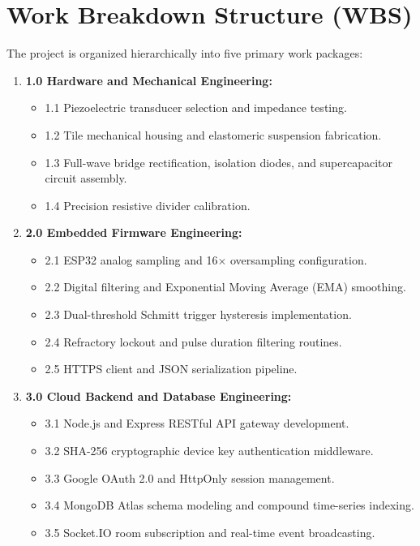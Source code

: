 \section{Work Breakdown Structure (WBS)}
The project is organized hierarchically into five primary work packages:
\begin{enumerate}
    \item \textbf{1.0 Hardware and Mechanical Engineering:}
    \begin{itemize}
        \item 1.1 Piezoelectric transducer selection and impedance testing.
        \item 1.2 Tile mechanical housing and elastomeric suspension fabrication.
        \item 1.3 Full-wave bridge rectification, isolation diodes, and supercapacitor circuit assembly.
        \item 1.4 Precision resistive divider calibration.
    \end{itemize}
    \item \textbf{2.0 Embedded Firmware Engineering:}
    \begin{itemize}
        \item 2.1 ESP32 analog sampling and 16$\times$ oversampling configuration.
        \item 2.2 Digital filtering and Exponential Moving Average (EMA) smoothing.
        \item 2.3 Dual-threshold Schmitt trigger hysteresis implementation.
        \item 2.4 Refractory lockout and pulse duration filtering routines.
        \item 2.5 HTTPS client and JSON serialization pipeline.
    \end{itemize}
    \item \textbf{3.0 Cloud Backend and Database Engineering:}
    \begin{itemize}
        \item 3.1 Node.js and Express RESTful API gateway development.
        \item 3.2 SHA-256 cryptographic device key authentication middleware.
        \item 3.3 Google OAuth 2.0 and HttpOnly session management.
        \item 3.4 MongoDB Atlas schema modeling and compound time-series indexing.
        \item 3.5 Socket.IO room subscription and real-time event broadcasting.
    \end{itemize}

\end{enumerate}
